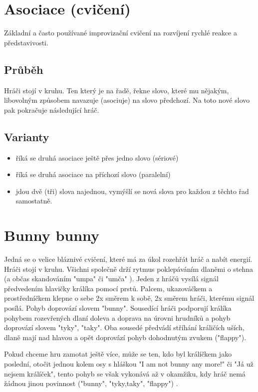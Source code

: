 \needspace{5cm} \section{Asociace (cvičení)} \label{asociace (cvičení)} Základní a často používané improvizační cvičení na rozvíjení rychlé reakce a představivosti. 
 
\subsection{Průběh} Hráči stojí v kruhu. Ten který je na řadě, řekne slovo, které mu nějakým, libovolným způsobem navazuje (asociuje) na slovo předchozí. Na toto nové slovo pak pokračuje následující hráč. 
 
\subsection{Varianty} \begin{itemize}
\item říká se druhá asociace ještě přes jedno slovo (sériové)
\item říká se druhá asociace na příchozí slovo (paralelní)
\item jdou dvě (tři) slova najednou, vymýšlí se nová slova pro každou z těchto řad samostatně.
\end{itemize}
 
 
 
 
 
 
 
\needspace{5cm} \section{Bunny bunny} \label{bunny bunny} Jedná se o velice bláznivé cvičení, které má za úkol rozehřát hráč a nabít energií. Hráči stojí v kruhu. Všichni společně drží rytmus poklepáváním dlaněmi o stehna (a občas skandováním "umpa"{} či "umča"{} ). Jeden z hráčů vysílá signál předvedením hlavičky králíka pomocí prstů. Palcem, ukazováčkem a prostředníčkem klepne o sebe 2x směrem k sobě, 2x směrem hráči, kterému signál posílá. Pohyb doprovází slovem "bunny". Sousedící hráči podporují králíka pohybem rozevřených dlaní doleva a doprava na úrovni hrudníků a pohyb doprovází slovem "tyky", "taky". Oba sousedé předvádí stříhání králičích uších, dlaně mají nad hlavou a opět doprovází pohyb dohodnutým zvukem ("flappy"). 
 
Pokud chceme hru zamotat ještě více, může se ten, kdo byl králíčkem jako poslední, otočit jednou kolem osy s hláškou "I am not bunny any more!"{} či "Já už nejsem králíček", tento pohyb se však vykonává až v okamžiku, kdy hráč nemá žádnou jinou povinnost ("bunny", "tyky,taky", "flappy") . 
 
